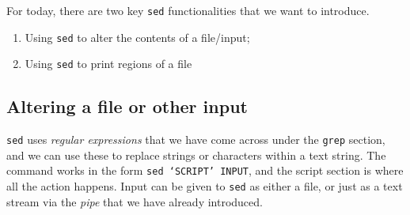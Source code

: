 \documentclass[a4paper,12pt,twoside]{memoir}
\begin{document}
For today, there are two key \texttt{sed} functionalities that we want to introduce.\\
\begin{enumerate}
\item Using \texttt{sed} to alter the contents of a file/input;
\item Using \texttt{sed} to print regions of a file
\end{enumerate}

\subsection*{Altering a file or other input}
\texttt{sed} uses \textit{regular expressions} that we have come across under the \texttt{grep} section, and we can use these to replace strings or characters within a text string.
The command works in the form \texttt{sed `SCRIPT' INPUT}, and the script section is where all the action happens.
Input can be given to \texttt{sed} as either a file, or just as a text stream via the \textit{pipe} that we have already introduced.
\end{document}
